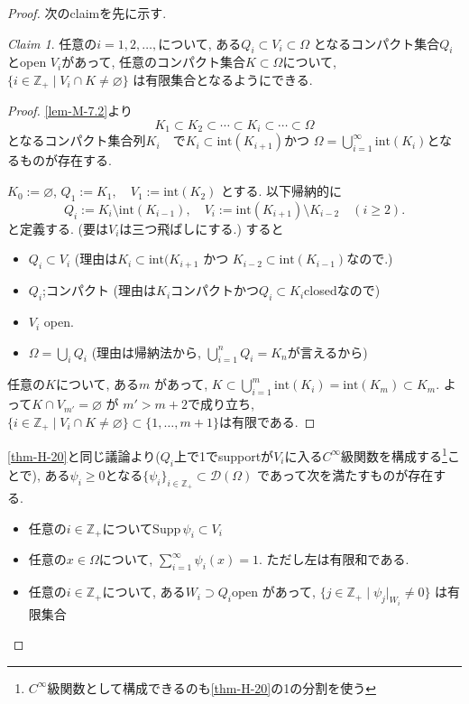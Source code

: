 \documentclass[dvipdfmx,a4paper,11pt]{article} %
\theoremstyle{definition}
\theoremstyle{remark}
\newtheorem{claim}[thm]{Claim}
\numberwithin{equation}{section}
\newcommand{\N}{\mathbb{Z}_+}
\begin{document}
\begin{proof}
次のclaimを先に示す. 
\begin{tcolorbox}[mybox]
\begin{claim}
任意の$i =1, 2, \ldots, $について, ある\(Q_i \subset V_i \subset \Omega\) 
となるコンパクト集合\(Q_i\)とopen \(V_i\)があって, 任意のコンパクト集合$K \subset \Omega$について, \(\{ i\in \N \mid V_i \cap K \neq \varnothing \}\) は有限集合となるようにできる. 
\end{claim}
\end{tcolorbox}
\begin{proof}
\ref{lem-M-7.2}より 
\[ K_1 \subset K_2 \subset \cdots \subset K_i \subset \cdots \subset \Omega\]
となるコンパクト集合列$K_i$　で\(K_i \subset \mathrm{int}(K_{i+1})\)かつ \(\Omega = \bigcup_{i=1}^\infty \mathrm{int}(K_i)\)となるものが存在する.

 \(K_0 := \varnothing\), 
\(Q_1 := K_1, \quad V_1 := \mathrm{int}(K_2)\)
とする. 
以下帰納的に
\[
Q_i := K_i \setminus \mathrm{int}(K_{i-1}), \quad V_i := \mathrm{int}(K_{i+1}) \setminus K_{i-2} \quad (i \geq 2).
\]
と定義する. (要は$V_i$は三つ飛ばしにする.)
すると
\begin{itemize}
\item \(Q_i \subset V_i\) (理由は\(K_i \subset \mathrm{int}(K_{i+1}\) かつ \(K_{i-2} \subset \mathrm{int}(K_{i-1})\)なので.)
\item \(Q_i\);コンパクト (理由は\(K_i\)コンパクトかつ\(Q_i \subset K_i\)closedなので)
\item \(V_i\) open. 
\item \(\Omega = \bigcup_i Q_i \)  (理由は帰納法から, $\bigcup_{i=1}^n Q_i = K_n$が言えるから)
\end{itemize}
任意の\(K\)について, ある\(m\) があって, \(K \subset \bigcup_{i=1}^m \mathrm{int}(K_i) = \mathrm{int}(K_m) \subset K_m\).
よって\(K \cap V_{m'} = \varnothing\) が \(m' > m+2\)で成り立ち, 
\(\{ i \in \N \mid V_i \cap K \neq \varnothing \} \subset \{1, \ldots, m+1\}\)は有限である. 
\end{proof}

\ref{thm-H-20}と同じ議論より($Q_i$上で1でsupportが$V_i$に入る$C^\infty$級関数を構成する\footnote{$C^\infty$級関数として構成できるのも\ref{thm-H-20}の1の分割を使う}ことで), 
ある$\psi_i \ge 0$となる\(\{\psi_i\}_{i \in \N} \subset \mathcal{D}(\Omega)\) であって次を満たすものが存在する. 
\begin{itemize}
\item 任意の$i \in \N$について\(\mathrm{Supp}\,\psi_i \subset V_i\)
\item  任意の$ x \in \Omega$について, \(\sum_{i=1}^\infty \psi_i(x) = 1\). ただし左は有限和である.  
\item 任意の$i \in \N$について, ある\(W_i \supset Q_i\)open があって,  \(\{ j \in \N \mid \psi_j|_{W_i} \neq 0 \}\) は有限集合
\end{itemize}


\end{proof}
\end{document}
